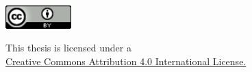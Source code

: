 \documentclass{dstu3008/dstu3008}
\title{\thesisTitle}
\author{\thesisAuthor}
\newcommand{\osh}{}
\newcommand{\osh}{}
\begin{document}

\setcounter{page}{4}

\newpage
\begin{center}
\leavevmode
\includegraphics[width=1in]{images/cc-by.png}
\label{fig:cc}
\end{center}
\begin{center}
This thesis is licensed under a \\
\href{http://creativecommons.org/licenses/by/4.0/}
{Creative Commons Attribution 4.0 International License.}
\end{center}
\newpage



\tableofcontents





\osh




\end{document}
